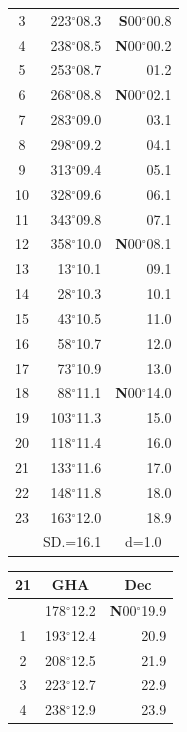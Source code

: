 \documentclass[10pt, a4paper]{report}
\begin{document}
\begin{scriptsize}
\begin{tabular*}{0.2\textwidth}[t]{@{\extracolsep{\fill}}|c|rr|}
3 & 223$^\circ$08.3 & \textbf{S}00$^\circ$00.8\\
4 & 238$^\circ$08.5 & \textbf{N}00$^\circ$00.2\\
5 & 253$^\circ$08.7 & 01.2\\[2Pt]
6 & 268$^\circ$08.8 & \textbf{N}00$^\circ$02.1\\
7 & 283$^\circ$09.0 & 03.1\\
8 & 298$^\circ$09.2 & 04.1\\
9 & 313$^\circ$09.4 & \raisebox{0.24ex}{\boldmath$\cdot$~\boldmath$\cdot$~~}05.1\\
10 & 328$^\circ$09.6 & 06.1\\
11 & 343$^\circ$09.8 & 07.1\\[2Pt]
12 & 358$^\circ$10.0 & \textbf{N}00$^\circ$08.1\\
13 & 13$^\circ$10.1 & 09.1\\
14 & 28$^\circ$10.3 & 10.1\\
15 & 43$^\circ$10.5 & \raisebox{0.24ex}{\boldmath$\cdot$~\boldmath$\cdot$~~}11.0\\
16 & 58$^\circ$10.7 & 12.0\\
17 & 73$^\circ$10.9 & 13.0\\[2Pt]
18 & 88$^\circ$11.1 & \textbf{N}00$^\circ$14.0\\
19 & 103$^\circ$11.3 & 15.0\\
20 & 118$^\circ$11.4 & 16.0\\
21 & 133$^\circ$11.6 & \raisebox{0.24ex}{\boldmath$\cdot$~\boldmath$\cdot$~~}17.0\\
22 & 148$^\circ$11.8 & 18.0\\
23 & 163$^\circ$12.0 & 18.9\\
\hline
\rule{0pt}{2.4ex} & \multicolumn{1}{c}{SD.=16.1} & \multicolumn{1}{c|}{d=1.0}\\
\hline
\end{tabular*}\noindent
\begin{tabular*}{0.2\textwidth}[t]{@{\extracolsep{\fill}}|c|rr|}
\hline
\multicolumn{1}{|c|}{\rule{0pt}{2.6ex}\textbf{21}} & \multicolumn{1}{c}{\textbf{GHA}} & \multicolumn{1}{c|}{\textbf{Dec}}\\
\hline\rule{0pt}{2.6ex}\noindent
0 & 178$^\circ$12.2 & \textbf{N}00$^\circ$19.9\\
1 & 193$^\circ$12.4 & 20.9\\
2 & 208$^\circ$12.5 & 21.9\\
3 & 223$^\circ$12.7 & \raisebox{0.24ex}{\boldmath$\cdot$~\boldmath$\cdot$~~}22.9\\
4 & 238$^\circ$12.9 & 23.9\\

\end{tabular*}
\end{scriptsize}
\end{document}
